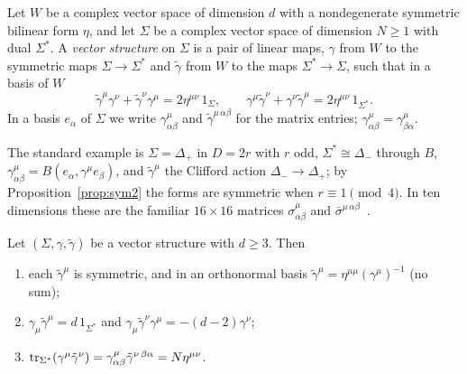 \begin{definition}
\label{def:vector}
Let $W$ be a complex vector space of dimension $d$ with a nondegenerate symmetric bilinear form $\eta$, and let $\Sigma$ be a complex vector space of dimension $N\ge1$ with dual $\Sigma^*$. A \emph{vector structure} on $\Sigma$ is a pair of linear maps, $\gamma$ from $W$ to the symmetric maps $\Sigma\to\Sigma^*$ and $\tilde\gamma$ from $W$ to the maps $\Sigma^*\to\Sigma$, such that in a basis of $W$
\begin{equation}
\label{eq:clifford}
\tilde\gamma^\mu\gamma^\nu+\tilde\gamma^\nu\gamma^\mu=2\eta^{\mu\nu}\,1_\Sigma,\qquad \gamma^\mu\tilde\gamma^\nu+\gamma^\nu\tilde\gamma^\mu=2\eta^{\mu\nu}\,1_{\Sigma^*}.
\end{equation}
In a basis $e_\alpha$ of $\Sigma$ we write $\gamma^\mu_{\alpha\beta}$ and $\tilde\gamma^{\mu\,\alpha\beta}$ for the matrix entries; $\gamma^\mu_{\alpha\beta}=\gamma^\mu_{\beta\alpha}$.
\end{definition}

The standard example is $\Sigma=\Delta_+$ in $D=2r$ with $r$ odd, $\Sigma^*\cong\Delta_-$ through $B$, $\gamma^\mu_{\alpha\beta}=B(e_\alpha,\gamma^\mu e_\beta)$, and $\tilde\gamma^\mu$ the Clifford action $\Delta_-\to\Delta_+$; by Proposition~\ref{prop:sym2} the forms are symmetric when $r\equiv1\pmod4$. In ten dimensions these are the familiar $16\times16$ matrices $\sigma^\mu_{\alpha\beta}$ and $\bar\sigma^{\mu\,\alpha\beta}$~\cite{FreedmanVanProeyen2012}.

\begin{lemma}
\label{lem:traces}
Let $(\Sigma,\gamma,\tilde\gamma)$ be a vector structure with $d\ge3$. Then
\begin{enumerate}[label=(\alph*)]
\item each $\tilde\gamma^\mu$ is symmetric, and in an orthonormal basis $\tilde\gamma^\mu=\eta^{\mu\mu}(\gamma^\mu)^{-1}$ (no sum);
\item $\gamma_\mu\tilde\gamma^\mu=d\,1_{\Sigma^*}$ and $\gamma_\mu\tilde\gamma^\nu\gamma^\mu=-(d-2)\gamma^\nu$;
\item $\operatorname{tr}_{\Sigma^*}(\gamma^\mu\tilde\gamma^\nu)=\gamma^\mu_{\alpha\beta}\tilde\gamma^{\nu\,\beta\alpha}=N\eta^{\mu\nu}$.
\end{enumerate}
\end{lemma}

